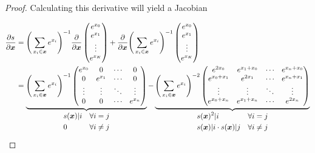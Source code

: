 \documentclass[11pt]{article}
\newcommand{\pd}{\partial}
\newcommand{\bs}{\boldsymbol}
\begin{document}
\begin{proof}
	Calculating this derivative will yield a Jacobian

	\begin{align}
		\frac{\pd s}{\pd \bs{x}}
		&=
		\Bigg(\Sum_{x_i\in\bs{x}}e^{x_i}\Bigg)^{-1}
		\frac{\pd}{\pd\bs{x}}
		\begin{pmatrix}
			e^{x_0} \\
			e^{x_1} \\
			\vdots \\
			e^{x_K}
		\end{pmatrix}
		+
		\frac{\pd}{\pd \bs{x}} \Bigg(\Sum_{x_i\in\bs{x}}e^{x_i}\Bigg)^{-1}
		\begin{pmatrix}
			e^{x_0} \\
			e^{x_1} \\
			\vdots \\
			e^{x_K}
		\end{pmatrix}
		\\
		&=
		\underbrace{
			\Bigg(\Sum_{x_i\in\bs{x}}e^{x_i}\Bigg)^{-1}
			\begin{pmatrix}
				e^{x_0} & 0 & \cdots & 0 \\
				0 & e^{x_1} & \cdots & 0 \\
				\vdots & \vdots & \ddots & \vdots \\
				0 & 0 & \cdots & e^{x_n} \\
			\end{pmatrix}
		}_{
			\begin{aligned}
				&s(\bs{x})\vert i &\forall i=j \\
				&0 &\forall i\neq j \\
			\end{aligned}
		}
		-
		\underbrace{
			\Bigg(\Sum_{x_i\in\bs{x}}e^{x_i}\Bigg)^{-2}
			\begin{pmatrix}
				e^{2 x_0} & e^{x_1 + x_0}  & \cdots & e^{x_n + x_0} \\
				e^{x_0 +x_1} & e^{2 x_1} & \cdots & e^{x_n + x_1} \\
				\vdots & \vdots & \ddots & \vdots \\
				e^{x_0 + x_n} & e^{x_1 + x_n}  & \cdots & e^{2 x_n} \\
			\end{pmatrix}
		}_{
			\begin{aligned}
				&s(\bs{x})^2\vert i &\forall i=j \\
				&s(\bs{x})\vert i\cdot
					s(\bs{x})\vert j
					&\forall i\neq j \\
			\end{aligned}
		}
		\\
	\end{align}


\end{proof}
\end{document}
